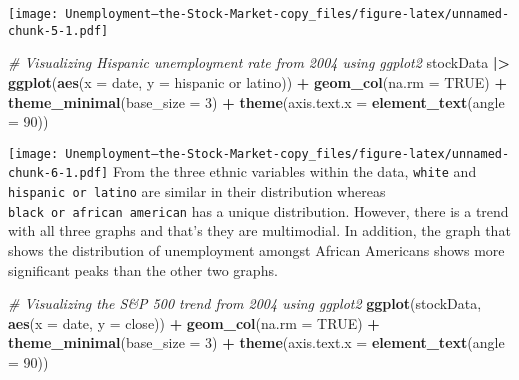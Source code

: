 \documentclass[
]{article}
\newenvironment{Shaded}{\begin{snugshade}}{\end{snugshade}}
\newcommand{\AttributeTok}[1]{\textcolor[rgb]{0.13,0.29,0.53}{#1}}
\newcommand{\CommentTok}[1]{\textcolor[rgb]{0.56,0.35,0.01}{\textit{#1}}}
\newcommand{\ConstantTok}[1]{\textcolor[rgb]{0.56,0.35,0.01}{#1}}
\newcommand{\DecValTok}[1]{\textcolor[rgb]{0.00,0.00,0.81}{#1}}
\newcommand{\FunctionTok}[1]{\textcolor[rgb]{0.13,0.29,0.53}{\textbf{#1}}}
\newcommand{\NormalTok}[1]{#1}
\newcommand{\SpecialCharTok}[1]{\textcolor[rgb]{0.81,0.36,0.00}{\textbf{#1}}}
\newcommand{\StringTok}[1]{\textcolor[rgb]{0.31,0.60,0.02}{#1}}
\begin{document}
\texttt{[image: Unemployment---the-Stock-Market-copy\_files/figure-latex/unnamed-chunk-5-1.pdf]}

\begin{Shaded}
\begin{Highlighting}[]
\CommentTok{\# Visualizing Hispanic unemployment rate from 2004 using ggplot2}
\NormalTok{stockData }\SpecialCharTok{|\textgreater{}}
  \FunctionTok{ggplot}\NormalTok{(}\FunctionTok{aes}\NormalTok{(}\AttributeTok{x =}\NormalTok{ date, }\AttributeTok{y =} \StringTok{\textasciigrave{}}\AttributeTok{hispanic or latino}\StringTok{\textasciigrave{}}\NormalTok{)) }\SpecialCharTok{+}
  \FunctionTok{geom\_col}\NormalTok{(}\AttributeTok{na.rm =} \ConstantTok{TRUE}\NormalTok{) }\SpecialCharTok{+} 
  \FunctionTok{theme\_minimal}\NormalTok{(}\AttributeTok{base\_size =} \DecValTok{3}\NormalTok{) }\SpecialCharTok{+}
  \FunctionTok{theme}\NormalTok{(}\AttributeTok{axis.text.x =} \FunctionTok{element\_text}\NormalTok{(}\AttributeTok{angle =} \DecValTok{90}\NormalTok{))}
\end{Highlighting}
\end{Shaded}

\texttt{[image: Unemployment---the-Stock-Market-copy\_files/figure-latex/unnamed-chunk-6-1.pdf]}
From the three ethnic variables within the data, \texttt{white} and
\texttt{hispanic\ or\ latino} are similar in their distribution whereas
\texttt{black\ or\ african\ american} has a unique distribution.
However, there is a trend with all three graphs and that's they are
multimodial. In addition, the graph that shows the distribution of
unemployment amongst African Americans shows more significant peaks than
the other two graphs.

\begin{Shaded}
\begin{Highlighting}[]
\CommentTok{\# Visualizing the S\&P 500 trend from 2004 using ggplot2}
\FunctionTok{ggplot}\NormalTok{(stockData, }\FunctionTok{aes}\NormalTok{(}\AttributeTok{x =}\NormalTok{ date, }\AttributeTok{y =}\NormalTok{ close)) }\SpecialCharTok{+}
  \FunctionTok{geom\_col}\NormalTok{(}\AttributeTok{na.rm =} \ConstantTok{TRUE}\NormalTok{) }\SpecialCharTok{+} 
  \FunctionTok{theme\_minimal}\NormalTok{(}\AttributeTok{base\_size =} \DecValTok{3}\NormalTok{) }\SpecialCharTok{+}
  \FunctionTok{theme}\NormalTok{(}\AttributeTok{axis.text.x =} \FunctionTok{element\_text}\NormalTok{(}\AttributeTok{angle =} \DecValTok{90}\NormalTok{))}
\end{Highlighting}
\end{Shaded}
\end{document}
